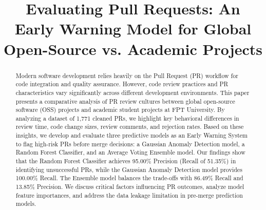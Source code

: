 \documentclass[conference]{IEEEtran}
\begin{document}
\title{Evaluating Pull Requests: An Early Warning Model for Global Open-Source vs. Academic Projects}

\author{
\and
{}
\and
{}
\and
{}
}

\maketitle

\begin{abstract}
Modern software development relies heavily on the Pull Request (PR) workflow for code integration and quality assurance. However, code review practices and PR characteristics vary significantly across different development environments. This paper presents a comparative analysis of PR review cultures between global open-source software (OSS) projects and academic student projects at FPT University. By analyzing a dataset of 1,771 cleaned PRs, we highlight key behavioral differences in review time, code change sizes, review comments, and rejection rates. Based on these insights, we develop and evaluate three predictive models as an Early Warning System to flag high-risk PRs before merge decisions: a Gaussian Anomaly Detection model, a Random Forest Classifier, and an Average Voting Ensemble model. Our findings show that the Random Forest Classifier achieves 95.00\% Precision (Recall of 51.35\%) in identifying unsuccessful PRs, while the Gaussian Anomaly Detection model provides 100.00\% Recall. The Ensemble model balances the trade-offs with 86.49\% Recall and 13.85\% Precision. We discuss critical factors influencing PR outcomes, analyze model feature importances, and address the data leakage limitation in pre-merge prediction models.
\end{abstract}
\end{document}
